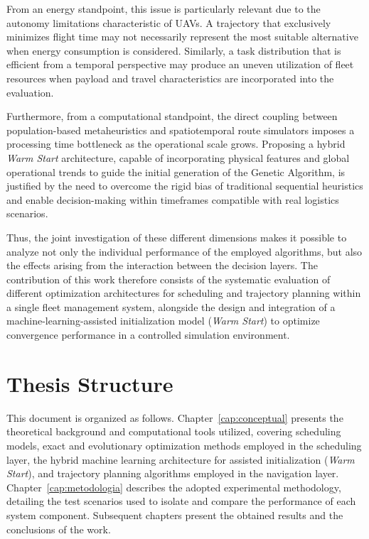 From an energy standpoint, this issue is particularly relevant due to the autonomy limitations characteristic of UAVs. A trajectory that exclusively minimizes flight time may not necessarily represent the most suitable alternative when energy consumption is considered. Similarly, a task distribution that is efficient from a temporal perspective may produce an uneven utilization of fleet resources when payload and travel characteristics are incorporated into the evaluation.

Furthermore, from a computational standpoint, the direct coupling between population-based metaheuristics and spatiotemporal route simulators imposes a processing time bottleneck as the operational scale grows. Proposing a hybrid \textit{Warm Start} architecture, capable of incorporating physical features and global operational trends to guide the initial generation of the Genetic Algorithm, is justified by the need to overcome the rigid bias of traditional sequential heuristics and enable decision-making within timeframes compatible with real logistics scenarios.

Thus, the joint investigation of these different dimensions makes it possible to analyze not only the individual performance of the employed algorithms, but also the effects arising from the interaction between the decision layers. The contribution of this work therefore consists of the systematic evaluation of different optimization architectures for scheduling and trajectory planning within a single fleet management system, alongside the design and integration of a machine-learning-assisted initialization model (\textit{Warm Start}) to optimize convergence performance in a controlled simulation environment.

\section{Thesis Structure}

This document is organized as follows. Chapter~\ref{cap:conceptual} presents the theoretical background and computational tools utilized, covering scheduling models, exact and evolutionary optimization methods employed in the scheduling layer, the hybrid machine learning architecture for assisted initialization (\textit{Warm Start}), and trajectory planning algorithms employed in the navigation layer. Chapter~\ref{cap:metodologia} describes the adopted experimental methodology, detailing the test scenarios used to isolate and compare the performance of each system component. Subsequent chapters present the obtained results and the conclusions of the work.